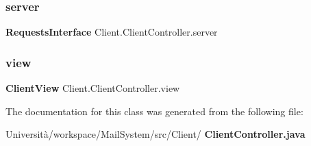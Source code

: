 \subsubsection{server}
{\footnotesize\ttfamily \textbf{ Requests\+Interface} Client.\+Client\+Controller.\+server}

\mbox{\label{class_client_1_1_client_controller_a73bcd04ccdf01c9c77608da13b950393}} 
\subsubsection{view}
{\footnotesize\ttfamily \textbf{ Client\+View} Client.\+Client\+Controller.\+view\hspace{0.3cm}{\ttfamily [package]}}



The documentation for this class was generated from the following file\+:\begin{DoxyCompactItemize}
\item 
Università/workspace/\+Mail\+System/src/\+Client/\textbf{ Client\+Controller.\+java}\end{DoxyCompactItemize}
